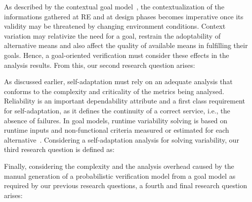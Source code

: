 
As described by the contextual goal model~\cite{Ali:2010}, the contextualization of the informations gathered at RE and at design phases becomes imperative once its validity may be threatened by changing environment conditions. Context variation may relativize the need for a goal, restrain the adoptability of alternative means and also affect the quality of available means in fulfilling their goals. Hence, a goal-oriented verification must consider these effects in the analysis results. From this, our second research question arises:

\bigskip

\noindent{}\bigskip

As discussed earlier, self-adaptation must rely on an adequate analysis that conforms to the complexity and criticality of the metrics being analysed. Reliability is an important dependability attribute and a first class requirement for self-adaptation, as it defines the continuity of a correct service, i.e., the absence of failures. In goal models, runtime variability solving is based on runtime inputs and non-functional criteria measured or estimated for each alternative~\cite{Yu:2008}. Considering a self-adaptation analysis for solving variability, our third research question is defined as:

\bigskip

\setlength{\fboxsep}{10pt}
\noindent{}\bigskip

Finally, considering the complexity and the analysis overhead caused by the manual generation of a probabilistic verification model from a goal model as required by our previous research questions, a fourth and final research question arises:

